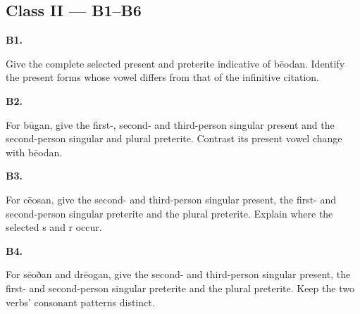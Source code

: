 \subsection*{Class II — B1–B6}

\par\begin{minipage}{\linewidth}\raggedright
\textbf{B1.}

Give the complete selected present and preterite indicative of bēodan. Identify the present forms whose vowel differs from that of the infinitive citation.

\end{minipage}\par\addvspace{4pt}

\par\begin{minipage}{\linewidth}\raggedright
\textbf{B2.}

For būgan, give the first-, second- and third-person singular present and the second-person singular and plural preterite. Contrast its present vowel change with bēodan.

\end{minipage}\par\addvspace{4pt}

\par\begin{minipage}{\linewidth}\raggedright
\textbf{B3.}

For cēosan, give the second- and third-person singular present, the first- and second-person singular preterite and the plural preterite. Explain where the selected s and r occur.

\end{minipage}\par\addvspace{4pt}

\par\begin{minipage}{\linewidth}\raggedright
\textbf{B4.}

For sēoðan and drēogan, give the second- and third-person singular present, the first- and second-person singular preterite and the plural preterite. Keep the two verbs’ consonant patterns distinct.

\end{minipage}\par\addvspace{4pt}

